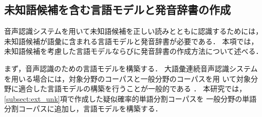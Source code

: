 \documentclass[japanese]{jnlp_1.4}
\begin{document}
\subsection{未知語候補を含む言語モデルと発音辞書の作成}
\label{subsect:ucest}

音声認識システムを用いて未知語候補を正しい読みとともに認識するためには，
未知語候補が語彙に含まれる言語モデルと発音辞書が必要である．
本項では，未知語候補を考慮した言語モデルならびに発音辞書の作成方法について述べる．

まず，音声認識のための言語モデルを構築する．
大語彙連続音声認識システムを用いる場合には，対象分野のコーパスと一般分野のコーパスを用
いて対象分野に適合した言語モデルの構築を行うことが一般的である
\cite{Task.adaptation.in.stochastic.language.models.for.continuous.speech.recognition}
\cite{N-gram出現回数の混合によるタスク適応の性能解析}
．
本研究では，\ref{subsect:ext_unk}項で作成した疑似確率的単語分割コーパスを
一般分野の単語分割コーパスに追加し，言語モデルを構築する．
\end{document}

